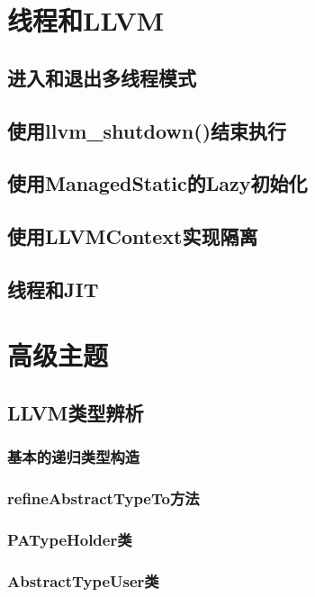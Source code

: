 \documentclass[12pt,a4paper]{article}
\begin{document}
\section{线程和LLVM}

\subsection{进入和退出多线程模式}

\subsection{使用llvm\_shutdown()结束执行}

\subsection{使用ManagedStatic的Lazy初始化}

\subsection{使用LLVMContext实现隔离}

\subsection{线程和JIT}

\section{高级主题}

\subsection{LLVM类型辨析}

\subsubsection{基本的递归类型构造}

\subsubsection{refineAbstractTypeTo方法}

\subsubsection{PATypeHolder类}

\subsubsection{AbstractTypeUser类}
\end{document}
